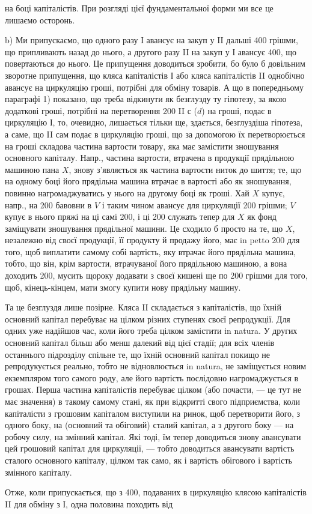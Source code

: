 \parcont{}  %
на боці капіталістів. При розгляді цієї фундаментальної форми ми все це
лишаємо осторонь.

b) Ми припускаємо, що одного разу І авансує на закуп у II дальші
400 грішми, що припливають назад до нього, а другого разу
II на закуп у І авансує 400, що повертаються до нього. Це
припущення доводиться зробити, бо було б довільним зворотне припущення,
що кляса капіталістів І або кляса капіталістів II однобічно авансує
на циркуляцію гроші, потрібні для обміну товарів. А що в попередньому
параграфі 1) показано, що треба відкинути як безглузду ту гіпотезу, за
якою додаткові гроші, потрібні на перетворення 200 II $с$ ($d$) на гроші,
подає в циркуляцію І, то, очевидно, лишається тільки ще, здається, безглуздіша
гіпотеза, а саме, що II сам подає в циркуляцію гроші, що за допомогою
їх перетворюється на гроші складова частина вартости товару,
яка має замістити зношування основного капіталу. Напр., частина вартости,
втрачена в продукції прядільною машиною пана $X$, знову з’являється
як частина вартости ниток до шиття; те, що на одному боці його прядільна
машина втрачає в вартості або як зношування, повинно нагромаджуватись
у нього на другому боці як гроші. Хай $X$ купує, напр., на
200 бавовни в $V$ і таким чином авансує для циркуляції 200 грішми; $V$ купує в нього пряжі на ці самі 200, і ці
200 служать тепер для $X$ як фонд заміщувати зношування прядільної
машини. Це сходило б просто на те, що $X$, незалежно від своєї
продукції, її продукту й продажу його, має in petto 200 для
того, щоб виплатити самому собі вартість, яку втрачає його прядільна
машина, тобто, що він, крім вартости, втрачуваної його прядільною машиною,
а вона доходить 200, мусить щороку додавати з своєї
кишені ще по 200 грішми для того, щоб, кінець-кінцем, мати
змогу купити нову прядільну машину.

Та це безглуздя лише позірне. Кляса II складається з капіталістів,
що їхній основний капітал перебуває на цілком різних ступенях своєї
репродукції. Для одних уже надійшов час, коли його треба цілком замістити
in natura. У других основний капітал більш або менш далекий
від цієї стадії; для всіх членів останнього підрозділу спільне те, що їхній
основний капітал покищо не репродукується реально, тобто не відновлюється
in natura, не заміщується новим екземпляром того самого роду,
але його вартість послідовно нагромаджується в грошах. Перша частина
капіталістів перебуває цілком (або почасти, — це тут не має значення)
в такому самому стані, як при відкритті свого підприємства, коли капіталісти
з грошовим капіталом виступили на ринок, щоб перетворити його,
з одного боку, на (основний та обіговий) сталий капітал, а з другого
боку — на робочу силу, на змінний капітал. Які тоді, їм тепер доводиться
знову авансувати цей грошовий капітал для циркуляції, — тобто доводиться
авансувати вартість сталого основного капіталу, цілком так само, як і вартість
обігового і вартість змінного капіталу.

Отже, коли припускається, що з 400, подаваних в циркуляцію
клясою капіталістів II для обміну з І, одна половина походить від
\parbreak{}  %
